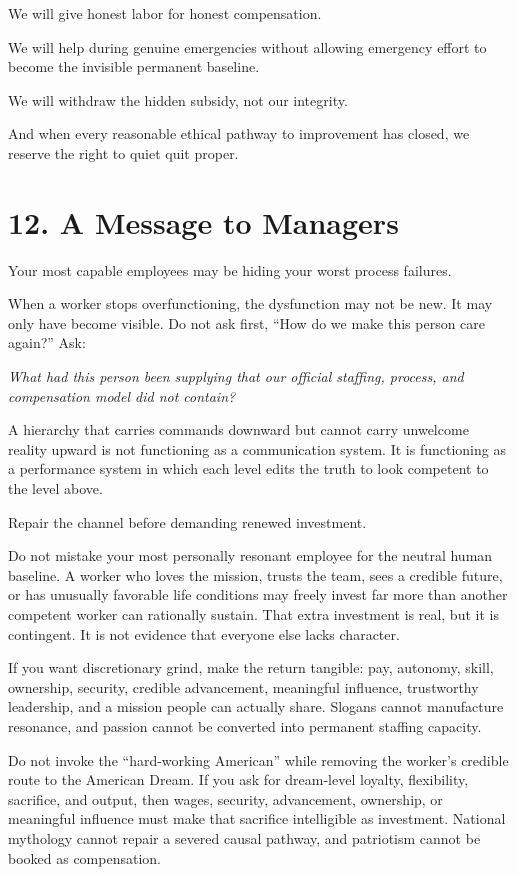 \documentclass[11pt,oneside]{article}
\renewenvironment{quote}
  {\begin{tcolorbox}[
      enhanced,
      breakable,
      colback=ManifestLight,
      colframe=ManifestRule,
      boxrule=0pt,
      leftrule=3pt,
      arc=0pt,
      outer arc=0pt,
      left=10pt,right=10pt,top=8pt,bottom=8pt,
      before skip=0.8em,after skip=0.8em
    ]\itshape}
  {\end{tcolorbox}}
\begin{document}
We will give honest labor for honest compensation.

We will help during genuine emergencies without allowing emergency
effort to become the invisible permanent baseline.

We will withdraw the hidden subsidy, not our integrity.

And when every reasonable ethical pathway to improvement has closed, we
reserve the right to quiet quit proper.

\section{12. A Message to Managers}\label{a-message-to-managers}

Your most capable employees may be hiding your worst process failures.

When a worker stops overfunctioning, the dysfunction may not be new. It
may only have become visible. Do not ask first, ``How do we make this
person care again?'' Ask:

\begin{quote}
What had this person been supplying that our official staffing, process,
and compensation model did not contain?
\end{quote}

A hierarchy that carries commands downward but cannot carry unwelcome
reality upward is not functioning as a communication system. It is
functioning as a performance system in which each level edits the truth
to look competent to the level above.

Repair the channel before demanding renewed investment.

Do not mistake your most personally resonant employee for the neutral
human baseline. A worker who loves the mission, trusts the team, sees a
credible future, or has unusually favorable life conditions may freely
invest far more than another competent worker can rationally sustain.
That extra investment is real, but it is contingent. It is not evidence
that everyone else lacks character.

If you want discretionary grind, make the return tangible: pay,
autonomy, skill, ownership, security, credible advancement, meaningful
influence, trustworthy leadership, and a mission people can actually
share. Slogans cannot manufacture resonance, and passion cannot be
converted into permanent staffing capacity.

Do not invoke the ``hard-working American'' while removing the worker's
credible route to the American Dream. If you ask for dream-level
loyalty, flexibility, sacrifice, and output, then wages, security,
advancement, ownership, or meaningful influence must make that sacrifice
intelligible as investment. National mythology cannot repair a severed
causal pathway, and patriotism cannot be booked as compensation.
\end{document}
